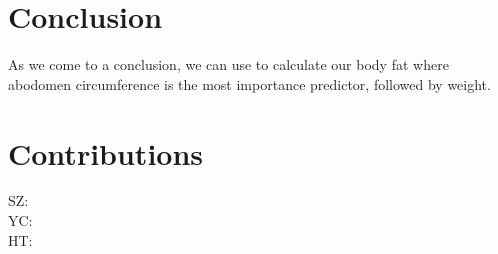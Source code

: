 \documentclass[11pt, letterpaper]{article}
\begin{document}
\section{Conclusion}
As we come to a conclusion, we can use  to calculate our body fat where abodomen circumference is the most importance predictor, followed by weight. 

\section{Contributions}
SZ:  \\
YC:   \\
HT:   \\

\pagebreak

{\small


}
\end{document}
